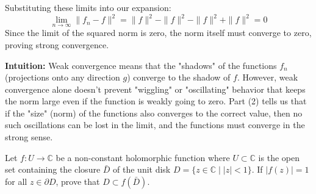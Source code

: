 \begin{solution}
\par\vspace{\baselineskip}
Substituting these limits into our expansion:
\[
\lim_{n\to\infty} \|f_n - f\|^2 = \|f\|^2 - \|f\|^2 - \|f\|^2 + \|f\|^2 = 0
\]
Since the limit of the squared norm is zero, the norm itself must converge to zero, proving strong convergence.

\par\vspace{\baselineskip}
\textbf{Intuition:} 
Weak convergence means that the "shadows" of the functions $f_n$ (projections onto any direction $g$) converge to the shadow of $f$. However, weak convergence alone doesn't prevent "wiggling" or "oscillating" behavior that keeps the norm large even if the function is weakly going to zero. Part (2) tells us that if the "size" (norm) of the functions also converges to the correct value, then no such oscillations can be lost in the limit, and the functions must converge in the strong sense.
\end{solution}

\begin{exercise}
\label{analysis:2018:2}
Let $f:U\to\mathbb{C}$ be a non-constant holomorphic function where $U\subset\mathbb{C}$ is the open set containing the closure $\bar{D}$ of the unit disk $D=\{z\in\mathbb{C}\mid |z|<1\}$. If $|f(z)|=1$ for all $z\in\partial D$, prove that $D\subset f(\bar{D})$.
\end{exercise}

